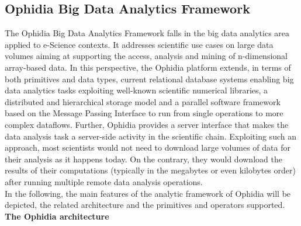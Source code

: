 
\subsection{Ophidia Big Data Analytics Framework}
\label{sec: background/ophidia}

The Ophidia Big Data Analytics Framework falls in the big data analytics area applied to e-Science contexts.
It addresses scientific use cases on large data volumes aiming at supporting the access, analysis and mining of n-dimensional array-based data. In this perspective, the Ophidia platform extends, in terms of both primitives and data types, current relational database systems enabling big data analytics tasks exploiting well-known scientific numerical libraries, a distributed and hierarchical storage model and a parallel software framework based on the Message Passing Interface to run from single operations to more complex dataflows. Further, Ophidia provides a server interface that makes the data analysis task a server-side activity in the scientific chain. Exploiting such an approach, most scientists would not need to download large volumes of data for their analysis as it happens today. On the contrary, they would download the results of their computations (typically in the megabytes or even kilobytes order) after running multiple remote data analysis operations.\\

In the following, the main features of the analytic framework of Ophidia will be depicted, the related architecture and the primitives and operators supported.\\

\textbf{The Ophidia architecture}\\

